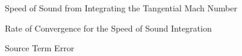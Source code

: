 \documentclass{article}
\begin{document}
\begin{figure}
    \centering
    
\end{figure}

 \begin{figure}
     \centering
         
 \end{figure}

 \begin{figure}
         
     \caption{Speed of Sound from Integrating the Tangential Mach Number}
 \end{figure}

%         

%         


 \begin{figure}
     \centering
         
     \caption{Rate of Convergence for the Speed of Sound Integration}
 \end{figure}

 \begin{figure}
         
     \caption{Source Term Error}
 \end{figure}

%         
%
%         
\end{document}
